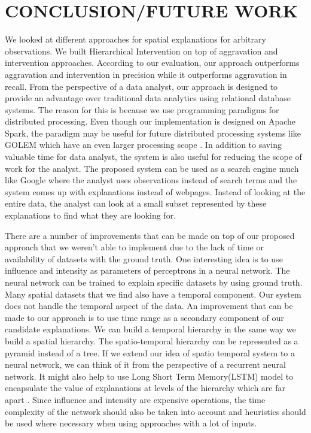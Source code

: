 \chapter{CONCLUSION/FUTURE WORK}
\label{chp:concl}
We looked at different approaches for spatial explanations for arbitrary observations. We built Hierarchical Intervention on top of aggravation and intervention approaches. According to our evaluation, our approach outperforms aggravation and intervention in precision while it outperforms aggravation in recall. From the perspective of a data analyst, our approach is designed to provide an advantage over traditional data analytics using relational database systems. The reason for this is because we use programming paradigms for distributed processing. Even though our implementation is designed on Apache Spark, the paradigm may be useful for future distributed processing systems like GOLEM which have an even larger processing scope \citep{golem2018}. In addition to saving valuable time for data analyst, the system is also useful for reducing the scope of work for the analyst. The proposed system can be used as a search engine much like Google where the analyst uses observations instead of search terms and the system comes up with explanations instead of webpages. Instead of looking at the entire data, the analyst can look at a small subset represented by these explanations to find what they are looking for.

There are a number of improvements that can be made on top of our proposed approach that we weren't able to implement due to the lack of time or availability of datasets with the ground truth. One interesting idea is to use influence and intensity as parameters of perceptrons in a neural network\citep{grossberg1988nonlinear,widrow199030}. The neural network can be trained to explain specific datasets by using ground truth.
Many spatial datasets that we find also have a temporal component. Our system does not handle the temporal aspect of the data. An improvement that can be made to our approach is to use time range as a secondary component of our candidate explanations. We can build a temporal hierarchy in the same way we build a spatial hierarchy. The spatio-temporal hierarchy can be represented as a pyramid instead of a tree.
If we extend our idea of spatio temporal system to a neural network, we can think of it from the perspective of a recurrent neural network\citep{chung2016hierarchical}. It might also help to use Long Short Term Memory(LSTM) model to encapsulate the value of explanations at levels of the hierarchy which are far apart \citep{hochreiter1997long}.
Since influence and intensity are expensive operations, the time complexity of the network should also be taken into account and heuristics should be used where necessary when using approaches with a lot of inputs.

